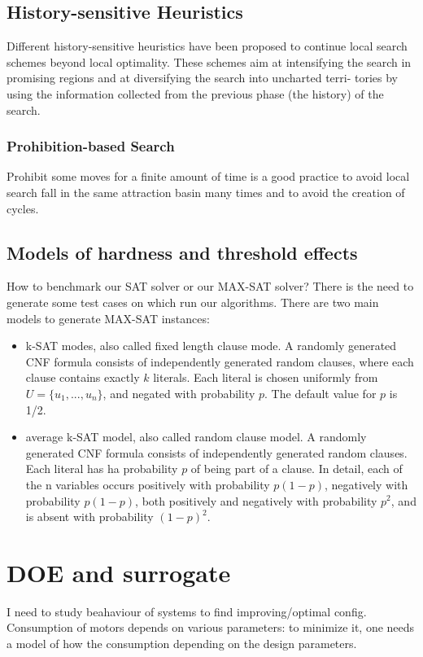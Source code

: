 \documentclass[10pt]{article}
\begin{document}
\subsection{History-sensitive Heuristics}

Different history-sensitive heuristics have been proposed to continue local search schemes beyond local optimality. These schemes aim at intensifying the search in promising regions and at diversifying the search into uncharted terri- tories by using the information collected from the previous phase (the history) of the search.

\subsubsection{Prohibition-based Search}
Prohibit some moves for a finite amount of time is a good practice to avoid local search fall in the same attraction basin many times and to avoid the creation of cycles. 

\subsection{Models of hardness and threshold effects}
How to benchmark our SAT solver or our MAX-SAT solver? There is the need to generate some test cases on which run our algorithms. There are two main models to generate MAX-SAT instances:
\begin{itemize}
\item{k-SAT modes, also called fixed length clause mode. A randomly generated CNF formula consists of independently generated random clauses, where each clause contains exactly $k$ literals. Each literal is chosen uniformly from $U = \{u_1 , ..., u_n \}$, and negated with probability $p$. The default value for $p$ is 1/2.}
\item{average k-SAT model, also called random clause model. A randomly generated CNF formula consists of independently generated random clauses. Each literal has ha probability $p$ of being part of a clause. In detail, each of the n variables occurs positively with probability $p(1 -p)$, negatively with probability $p(1 - p)$, both positively and negatively with probability $p^2$, and is absent with probability $(1 - p)^2.$}
\end{itemize}

\section{DOE and surrogate}
I need to study beahaviour of systems to find improving/optimal config.  Consumption of motors depends on various parameters: to minimize it, one needs a model of how the consumption depending on the design parameters.
\end{document}
